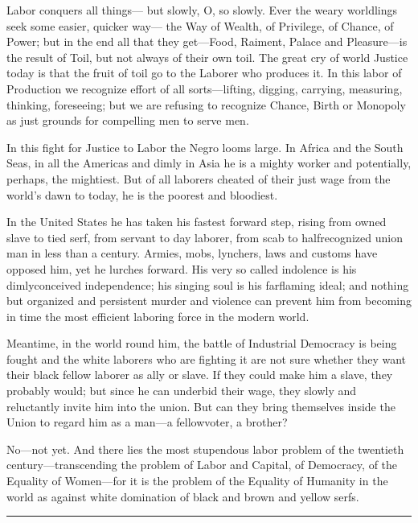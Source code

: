 \documentclass[letterpaper,10pt,english]{jupyterBook}
\begin{document}
\sphinxAtStartPar
Labor conquers all things— but slowly, O, so slowly. Ever the weary worldlings seek some easier, quicker way— the Way of Wealth, of Privilege, of Chance, of Power; but in the end all that they get—Food, Raiment, Palace and Pleasure—is the result of Toil, but not always of their own toil. The great cry of world Justice today is that the fruit of toil go to the Laborer who produces it. In this labor of Production we recognize effort of all sorts—lifting, digging, carrying, measuring, thinking, foreseeing; but we are refusing to recognize Chance, Birth or Monopoly as just grounds for compelling men to serve men.

\sphinxAtStartPar
In this fight for Justice to Labor the Negro looms large. In Africa and the South Seas, in all the Americas and dimly in Asia he is a mighty worker and potentially, perhaps, the mightiest. But of all laborers cheated of their just wage from the world’s dawn to today, he is the poorest and bloodiest.

\sphinxAtStartPar
In the United States he has taken his fastest forward step, rising from owned slave to tied serf, from servant to day laborer, from scab to half\sphinxhyphen{}recognized union man in less than a century. Armies, mobs, lynchers, laws and customs have opposed him, yet he lurches forward. His very so called indolence is his dimly\sphinxhyphen{}conceived independence; his singing soul is his far\sphinxhyphen{}flaming ideal; and nothing but organized and persistent murder and violence can prevent him from becoming in time the most efficient laboring force in the modern world.

\sphinxAtStartPar
Meantime, in the world round him, the battle of Industrial Democracy is being fought and the white laborers who are fighting it are not sure whether they want their black fellow laborer as ally or slave. If they could make him a slave, they probably would; but since he can underbid their wage, they slowly and reluctantly invite him into the union. But can they bring themselves inside the Union to regard him as a man—a fellow\sphinxhyphen{}voter, a brother?

\sphinxAtStartPar
No—not yet. And there lies the most stupendous labor problem of the twentieth century—transcending the problem of Labor and Capital, of Democracy, of the Equality of Women—for it is the problem of the Equality of Humanity in the world as against white domination of black and brown and yellow serfs.


\bigskip\hrule\bigskip
\end{document}
